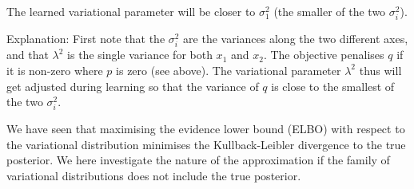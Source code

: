 \begin{exenumerate}
  \begin{solution}
    The learned variational parameter will be closer to $\sigma_1^2$
    (the smaller of the two $\sigma_i^2$).
      
    Explanation: First note that the $\sigma_i^2$ are the variances
    along the two different axes, and that $\lambda^2$ is the single
    variance for both $x_1$ and $x_2$. The objective penalises $q$ if
    it is non-zero where $p$ is zero (see above). The variational
    parameter $\lambda^2$ thus will get adjusted during learning so
    that the variance of $q$ is close to the smallest of the two
    $\sigma_i^2$.

  \end{solution}

\end{exenumerate}



We have seen that maximising the evidence lower bound (ELBO) with
respect to the variational distribution minimises the
Kullback-Leibler divergence to the true posterior. We here
investigate the nature of the approximation if the family of
variational distributions does not include the true posterior.

